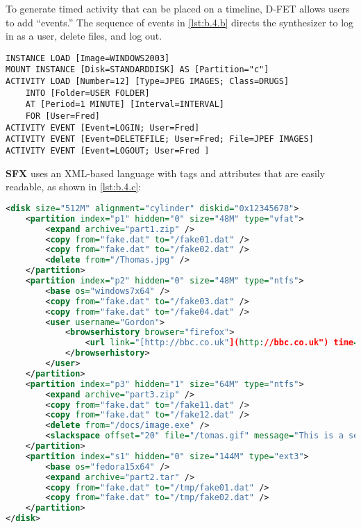 To generate timed activity that can be placed on a timeline, D-FET
allows users to add ``events.'' The sequence of events in
\autoref{lst:b.4.b} directs the synthesizer to log in as a user, delete
files, and log out.

\begin{lstlisting}[label={lst:b.4.b}, caption={Extension of the D-FET declarative scenario with events \cite{williamCloudbasedDigitalForensics2011}}, ]
INSTANCE LOAD [Image=WINDOWS2003] 
MOUNT INSTANCE [Disk=STANDARDDISK] AS [Partition="c"] 
ACTIVITY LOAD [Number=12] [Type=JPEG IMAGES; Class=DRUGS] 
    INTO [Folder=USER FOLDER] 
    AT [Period=1 MINUTE] [Interval=INTERVAL] 
    FOR [User=Fred]
ACTIVITY EVENT [Event=LOGIN; User=Fred] 
ACTIVITY EVENT [Event=DELETEFILE; User=Fred; File=JPEF IMAGES] 
ACTIVITY EVENT [Event=LOGOUT; User=Fred ]
\end{lstlisting}

\textbf{SFX} \cite{russellForensicImageDescription2012} uses an
XML-based language with tags and attributes that are easily readable, as
shown in \autoref{lst:b.4.c}:

\begin{lstlisting}[label={lst:b.4.c}, caption={Sample SFX declarative scenario expressed as XML \cite{russellForensicImageDescription2012}}, language=XML]
<disk size="512M" alignment="cylinder" diskid="0x12345678">
    <partition index="p1" hidden="0" size="48M" type="vfat">
        <expand archive="part1.zip" />
        <copy from="fake.dat" to="/fake01.dat" />
        <copy from="fake.dat" to="/fake02.dat" />
        <delete from="/Thomas.jpg" />
    </partition>
    <partition index="p2" hidden="0" size="48M" type="ntfs">
        <base os="windows7x64" />
        <copy from="fake.dat" to="/fake03.dat" />
        <copy from="fake.dat" to="/fake04.dat" />
        <user username="Gordon">
            <browserhistory browser="firefox">
                <url link="[http://bbc.co.uk"](http://bbc.co.uk") time="13:14:00 1 Jan 2013" />
            </browserhistory>
        </user>
    </partition>
    <partition index="p3" hidden="1" size="64M" type="ntfs">
        <expand archive="part3.zip" />
        <copy from="fake.dat" to="/fake11.dat" />
        <copy from="fake.dat" to="/fake12.dat" />
        <delete from="/docs/image.exe" />
        <slackspace offset="20" file="/tomas.gif" message="This is a secret message" />
    </partition>
    <partition index="s1" hidden="0" size="144M" type="ext3">
        <base os="fedora15x64" />
        <expand archive="part2.tar" />
        <copy from="fake.dat" to="/tmp/fake01.dat" />
        <copy from="fake.dat" to="/tmp/fake02.dat" />
    </partition>
</disk>
\end{lstlisting}

